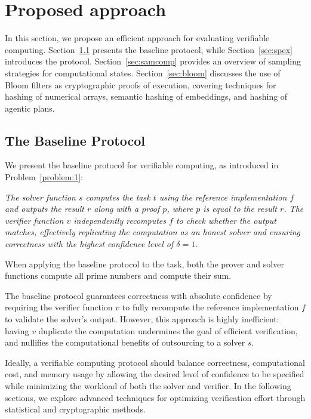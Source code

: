 \documentclass[sigconf, nonacm]{acmart}
\begin{document}
\section{Proposed approach}
\label{sec:proposal}

In this section, we propose an efficient approach for evaluating verifiable computing.
Section~\ref{sec:baseline} presents the baseline protocol, while Section~\ref{sec:spex} introduces the  protocol.
Section~\ref{sec:samcomp} provides an overview of sampling strategies for computational states.
Section~\ref{sec:bloom} discusses the use of Bloom filters as cryptographic proofs of execution, covering techniques for hashing of numerical arrays, semantic hashing of embeddings, and hashing of agentic plans.

\subsection{The Baseline Protocol}
\label{sec:baseline}

We present the baseline protocol for verifiable computing, as introduced in Problem~\ref{problem:1}:%

\vspace*{.1cm}
{\em The solver function $s$ computes the task $t$ using the reference implementation $f$ and outputs the result $r$ along with a proof $p$, where $p$ is equal to the result $r$. The verifier function $v$ independently recomputes $f$ to check whether the output matches, effectively replicating the computation as an honest solver and ensuring correctness with the highest confidence level of $\delta = 1$.}
\vspace*{.1cm}

When applying the baseline protocol to the  task, both the prover and solver functions compute all prime numbers and compute their sum.

The baseline protocol guarantees correctness with absolute confidence by requiring the verifier function $v$ to fully recompute the reference implementation $f$ to validate the solver’s output. However, this approach is highly inefficient: having $v$ duplicate the computation undermines the goal of efficient verification, and nullifies the computational benefits of outsourcing to a solver $s$.

Ideally, a verifiable computing protocol should balance correctness, computational cost, and memory usage by allowing the desired level of confidence to be specified while minimizing the workload of both the solver and verifier. In the following sections, we explore advanced techniques for optimizing verification effort through statistical and cryptographic methods.
\end{document}
